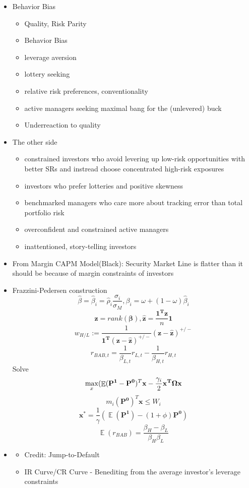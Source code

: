 \documentclass[11pt, openany]{book}              %
\DeclareMathOperator{\E}{\mathbb{E}}
\begin{document}
\begin{itemize}
	\item Behavior Bias
	\begin{itemize}
			\item Quality, Risk Parity
			\item Behavior Bias
			\item leverage aversion
			\item lottery seeking
			\item relative risk preferences, conventionality
			\item active managers seeking maximal bang for the (unlevered) buck
			\item Underreaction to quality
		\end{itemize}
	\item The other side
		\begin{itemize}
			\item constrained investors who avoid levering up low-risk opportunities with better SRs and instread choose concentrated high-risk exposures
			\item investors who prefer lotteries and positive skewness
			\item benchmarked managers who care more about tracking error than total portfolio risk
			\item overconfident and constrained active managers
			\item inattentioned, story-telling investors
		\end{itemize}
	\item From Margin CAPM Model(Black): Security Market Line is flatter than it should be because of margin constraints of investors
	\item Frazzini-Pedersen construction 
	   $$ \hat{\beta} = \hat{\beta}_i = \hat{\rho}_i \frac{\sigma_i}{\hat{\sigma}_M}, \beta_i = \omega + (1-\omega) \hat{\beta}_i$$
		$$ \boldsymbol{z} = rank(\boldsymbol{\beta}), \boldsymbol{\hat{z}} = \frac{\boldsymbol{1^Tz}}{n}\boldsymbol{1}$$
		$$ w_{H/L} := \frac{1}{\boldsymbol{1^T}(\boldsymbol{z}-\boldsymbol{\hat{z}})^{+/-}}(\boldsymbol{z}-\boldsymbol{\hat{z}})^{+/-} $$ 
		$$ r_{BAB,t} = \frac{1}{\beta_{L,t}}r_{L,t} -\frac{1}{\beta_{H,t}}r_{H,t}$$
		Solve
		$$ \max_{x} (\E(\mathbf{P^1} - \mathbf{P^0})^T \mathbf{x} - \frac{\gamma_i}{2} \bold{x^T\Omega x}$$
		$$ m_i (\mathbf{P^0})^T \mathbf{x} \leq W_i$$
		$$ \mathbf{x^*} = \frac{1}{\gamma}(\E(\mathbf{P^1}) - (1+\phi)\mathbf{P^0})$$
		$$ \E(r_{BAB}) = \frac{\beta_H - \beta_L}{\beta_H \beta_L}$$
	\item 
			\begin{itemize}
		 	\item Credit: Jump-to-Default
		 	\item IR Curve/CR Curve - Benediting from the average investor's leverage constraints
			\end{itemize}	
\end{itemize}
\end{document}
